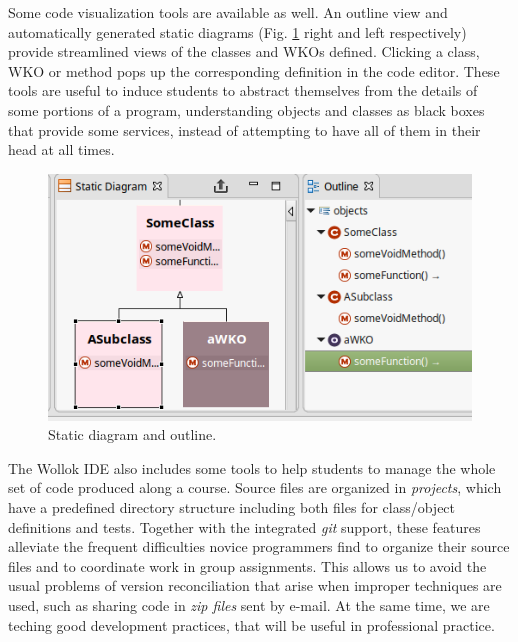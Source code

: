 Some code visualization tools are available as well. 
An outline view and automatically generated static diagrams (\cf Fig. \ref{fig:outline} right and left respectively) provide streamlined views of the classes and WKOs defined. 
Clicking a class, WKO or method pops up the corresponding definition in the code editor.
These tools are useful to induce students to abstract themselves from the details of some portions of a program, 
understanding objects and classes as black boxes that provide some services, 
instead of attempting to have all of them in their head at all times. 

\begin{figure}[ht]
\vspace{-2mm}
\centering
\includegraphics[scale=0.45]{images/outline.png}
\vspace{-2mm}
\caption{Static diagram and outline.}
\label{fig:outline}
\vspace{-3mm}
\end{figure}

The Wollok IDE also includes some tools to help students to manage the whole set of code produced along a course.
Source files are organized in \emph{projects}, 
which have a predefined directory structure 
including both files for class/object definitions and tests.
Together with the integrated \emph{git} support, 
these features alleviate the frequent difficulties novice programmers find 
to organize their source files and to coordinate work in group assignments.
This allows us to avoid the usual problems of version reconciliation
that arise when improper techniques are used,
such as sharing code in \emph{zip files} sent by e-mail.
At the same time, we are teching good development practices, that will be useful in professional practice.


